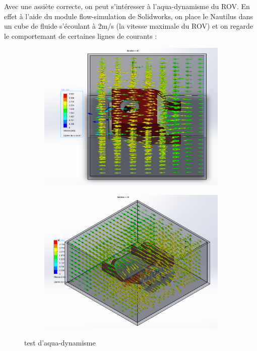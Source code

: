 \documentclass[a4paper,11pt]{report}
\begin{document}
				Avec une assiète correcte, on peut s'intéresser à l'aqua-dynamisme du ROV. En effet à l'aide du module flow-simulation de Solidworks, on place le Nautilus dans un cube de fluide s'écoulant à 2m/s (la vitesse maximale du ROV) et on regarde le comportemant de certaines lignes de courants :
									
					\begin{figure}[!h]
						\centering
							\begin{subfigure}[b]{0.3\textwidth}
								\includegraphics[width=\textwidth]{Photos/Capture22.png}
							\end{subfigure}
							\begin{subfigure}[b]{0.3\textwidth}
								\includegraphics[width=\textwidth]{Photos/Capture23.png}
							\end{subfigure}
							\caption{test d'aqua-dynamisme}
					\end{figure}\newline
					
\end{document}
